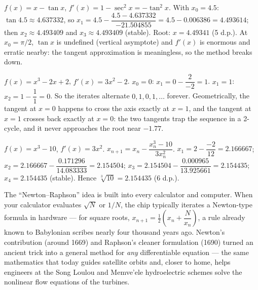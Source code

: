 \documentclass[11pt]{article}
\begin{document}
\begin{corrige}[Exercise 2]
$f(x)=x-\tan x$, $f'(x)=1-\sec^2 x = -\tan^2 x$. With $x_0=4.5$: $\tan 4.5 \approx 4.637332$, so
$x_1 = 4.5 - \dfrac{4.5 - 4.637332}{-21.504855} = 4.5 - 0.006386 = 4.493614$; then $x_2 \approx 4.493409$ and $x_3 \approx 4.493409$ (stable). Root: $x = 4.49341$ (5 d.p.). At $x_0=\pi/2$, $\tan x$ is undefined (vertical asymptote) and $f'(x)$ is enormous and erratic nearby: the tangent approximation is meaningless, so the method breaks down.
\end{corrige}

\begin{corrige}[Exercise 3]
$f(x)=x^3-2x+2$, $f'(x)=3x^2-2$. $x_0=0$: $x_1 = 0 - \dfrac{2}{-2} = 1$. $x_1=1$: $x_2 = 1 - \dfrac{1}{1} = 0$. So the iterates alternate $0,1,0,1,\dots$ forever. Geometrically, the tangent at $x=0$ happens to cross the axis exactly at $x=1$, and the tangent at $x=1$ crosses back exactly at $x=0$: the two tangents trap the sequence in a 2-cycle, and it never approaches the root near $-1.77$.
\end{corrige}

\begin{corrige}[Exercise 4]
$f(x)=x^3-10$, $f'(x)=3x^2$. $x_{n+1}=x_n-\dfrac{x_n^3-10}{3x_n^2}$. $x_1 = 2-\dfrac{-2}{12}=2.166667$; $x_2 = 2.166667-\dfrac{0.171296}{14.083333}=2.154504$; $x_3 = 2.154504-\dfrac{0.000965}{13.925661}=2.154435$; $x_4 = 2.154435$ (stable). Hence $\sqrt[3]{10} = 2.154435$ (6 d.p.).
\end{corrige}

\begin{savaistu}
The ``Newton--Raphson'' idea is built into every calculator and computer. When your calculator evaluates $\sqrt{N}$ or $1/N$, the chip typically iterates a Newton-type formula in hardware --- for square roots, $x_{n+1} = \tfrac12\!\left(x_n + \dfrac{N}{x_n}\right)$, a rule already known to Babylonian scribes nearly four thousand years ago. Newton's contribution (around 1669) and Raphson's cleaner formulation (1690) turned an ancient trick into a general method for \emph{any} differentiable equation --- the same mathematics that today guides satellite orbits and, closer to home, helps engineers at the Song Loulou and Memve'ele hydroelectric schemes solve the nonlinear flow equations of the turbines.
\end{savaistu}
\end{document}
